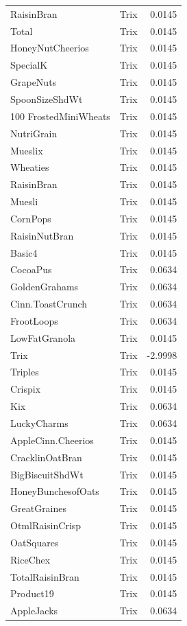 \begin{longtable}{llr}
RaisinBran & Trix & 0.0145 \\
Total & Trix & 0.0145 \\
HoneyNutCheerios & Trix & 0.0145 \\
SpecialK & Trix & 0.0145 \\
GrapeNuts & Trix & 0.0145 \\
SpoonSizeShdWt & Trix & 0.0145 \\
100%
FrostedMiniWheats & Trix & 0.0145 \\
NutriGrain & Trix & 0.0145 \\
Mueslix & Trix & 0.0145 \\
Wheaties & Trix & 0.0145 \\
RaisinBran & Trix & 0.0145 \\
Muesli & Trix & 0.0145 \\
CornPops & Trix & 0.0145 \\
RaisinNutBran & Trix & 0.0145 \\
Basic4 & Trix & 0.0145 \\
CocoaPus & Trix & 0.0634 \\
GoldenGrahams & Trix & 0.0634 \\
Cinn.ToastCrunch & Trix & 0.0634 \\
FrootLoops & Trix & 0.0634 \\
LowFatGranola & Trix & 0.0145 \\
Trix & Trix & -2.9998 \\
Triples & Trix & 0.0145 \\
Crispix & Trix & 0.0145 \\
Kix & Trix & 0.0634 \\
LuckyCharms & Trix & 0.0634 \\
AppleCinn.Cheerios & Trix & 0.0145 \\
CracklinOatBran & Trix & 0.0145 \\
BigBiscuitShdWt & Trix & 0.0145 \\
HoneyBunchesofOats & Trix & 0.0145 \\
GreatGraines & Trix & 0.0145 \\
OtmlRaisinCrisp & Trix & 0.0145 \\
OatSquares & Trix & 0.0145 \\
RiceChex & Trix & 0.0145 \\
TotalRaisinBran & Trix & 0.0145 \\
Product19 & Trix & 0.0145 \\
AppleJacks & Trix & 0.0634 \\

\end{longtable}
